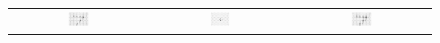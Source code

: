 \begin{figure}[htbp]
    \centering
    \newcommand{\figwidth}{0.16\textwidth}
    \begin{tabular}{ccc}
        {\includegraphics[width=\figwidth,height=\figwidth,clip,trim={1.65cm 0 1.65cm 0}]{figs/graph_conv_in.pdf}} &  
        \includegraphics[width=\figwidth,height=\figwidth,clip,trim={1.65cm 0 1.65cm 0}]{figs/graph_conv_kernel.pdf} &
        \includegraphics[width=\figwidth,height=\figwidth,clip,trim={1.65cm 0 1.65cm 0}]{figs/graph_conv_out.pdf} \\

\end{tabular}
\end{figure}
